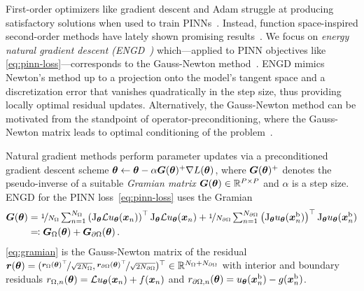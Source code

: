 First-order optimizers like gradient descent and Adam struggle at producing satisfactory solutions when used to train PINNs~\citep{cuomo2022scientific}.
Instead, function space-inspired second-order methods have lately shown promising results~\citep{muller2024optimization}.
We focus on \emph{energy natural gradient descent (ENGD~\cite{muller2023achieving})} which---applied to PINN objectives like \eqref{eq:pinn-loss}---corresponds to the Gauss-Newton method~\cite[Chapter 6.3,][]{bottou2016machine}.
ENGD mimics Newton's method up to a projection onto the model's tangent space and a discretization error that vanishes quadratically in the step size, thus providing locally optimal residual updates.
Alternatively, the Gauss-Newton method can be motivated from the standpoint of operator-preconditioning, where the Gauss-Newton matrix leads to optimal conditioning of the problem~\citep{de2023operator}.

Natural gradient methods perform parameter updates via a preconditioned gradient descent scheme ${\bm{\theta}} \leftarrow {\bm{\theta}} - \alpha {\bm{G}}({\bm{\theta}})^+\nabla L({\bm{\theta}})$, where ${\bm{G}}({\bm{\theta}})^+$ denotes the pseudo-inverse of a suitable \emph{Gramian matrix} ${\bm{G}}({\bm{\theta}}) \in {\mathbb{R}}^{P \times P}$ and $\alpha$ is a step size.
ENGD for the PINN loss~\eqref{eq:pinn-loss} uses the Gramian
\begin{align}\label{eq:gramian}
  \begin{split}
    {\bm{G}}({\bm{\theta}})
    &=
      \nicefrac{1}{N_\Omega}
      \textstyle
      \sum_{n=1}^{N_\Omega}
      \left( \mathrm{J}_{{\bm{\theta}}} \mathcal{L} u_{\bm{\theta}}({\bm{x}}_n) \right)^\top
      \mathrm{J}_{{\bm{\theta}}} \mathcal{L} u_{\bm{\theta}}({\bm{x}}_n)
      +
      \nicefrac{1}{N_{\partial\Omega}}
      \textstyle
      \sum_{n=1}^{N_{\partial\Omega}}
      \left(\mathrm{J}_{{\bm{\theta}}} u_{\bm{\theta}}({\bm{x}}_n^\text{b})  \right)^\top
      \mathrm{J}_{{\bm{\theta}}} u_{\bm{\theta}} ({\bm{x}}_n^\text{b})
    \\
    &\eqqcolon {\bm{G}}_\Omega({\bm{\theta}}) + {\bm{G}}_{\partial\Omega}({\bm{\theta}})\,.
  \end{split}
\end{align}
\eqref{eq:gramian} is the Gauss-Newton matrix of the residual ${\bm{r}}({\bm{\theta}}) = (\nicefrac{{\bm{r}}_\Omega({\bm{\theta}})^{\top}}{\sqrt{2N_\Omega}}, \nicefrac{{\bm{r}}_{\partial\Omega}({\bm{\theta}})^{\top}}{\sqrt{2N_{\partial\Omega}}} )^\top \in {\mathbb{R}}^{N_{\Omega} + N_{\partial\Omega}}$ with interior and boundary residuals $r_{\Omega,n}({\bm{\theta}}) = \mathcal{L} u_{\bm{\theta}}({\bm{x}}_n) + f({\bm{x}}_n)$ and $r_{\partial\Omega,n}({\bm{\theta}}) = u_{\bm{\theta}}({\bm{x}}_n^\text{b}) - g({\bm{x}}_n^\text{b})$.

